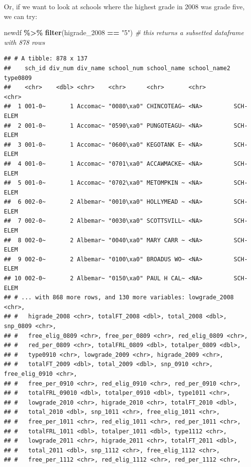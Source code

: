 \documentclass[
]{book}
\newenvironment{Shaded}{\begin{snugshade}}{\end{snugshade}}
\newcommand{\CommentTok}[1]{\textcolor[rgb]{0.56,0.35,0.01}{\textit{#1}}}
\newcommand{\DecValTok}[1]{\textcolor[rgb]{0.00,0.00,0.81}{#1}}
\newcommand{\KeywordTok}[1]{\textcolor[rgb]{0.13,0.29,0.53}{\textbf{#1}}}
\newcommand{\NormalTok}[1]{#1}
\newcommand{\OperatorTok}[1]{\textcolor[rgb]{0.81,0.36,0.00}{\textbf{#1}}}
\newcommand{\StringTok}[1]{\textcolor[rgb]{0.31,0.60,0.02}{#1}}
\begin{document}
Or, if we want to look at schools where the highest grade in 2008 was grade five, we can try:

\begin{Shaded}
\begin{Highlighting}[]
\NormalTok{newdf }\OperatorTok{\%\textgreater{}\%}\StringTok{ }\KeywordTok{filter}\NormalTok{(higrade\_}\DecValTok{2008} \OperatorTok{==}\StringTok{ "5"}\NormalTok{) }\CommentTok{\# this returns a subsetted dataframe with 878 rows}
\end{Highlighting}
\end{Shaded}

\begin{verbatim}
## # A tibble: 878 x 137
##    sch_id div_num div_name school_num school_name school_name2 type0809
##    <chr>    <dbl> <chr>    <chr>      <chr>       <chr>        <chr>   
##  1 001-0~       1 Accomac~ "0080\xa0" CHINCOTEAG~ <NA>         SCH-ELEM
##  2 001-0~       1 Accomac~ "0590\xa0" PUNGOTEAGU~ <NA>         SCH-ELEM
##  3 001-0~       1 Accomac~ "0600\xa0" KEGOTANK E~ <NA>         SCH-ELEM
##  4 001-0~       1 Accomac~ "0701\xa0" ACCAWMACKE~ <NA>         SCH-ELEM
##  5 001-0~       1 Accomac~ "0702\xa0" METOMPKIN ~ <NA>         SCH-ELEM
##  6 002-0~       2 Albemar~ "0010\xa0" HOLLYMEAD ~ <NA>         SCH-ELEM
##  7 002-0~       2 Albemar~ "0030\xa0" SCOTTSVILL~ <NA>         SCH-ELEM
##  8 002-0~       2 Albemar~ "0040\xa0" MARY CARR ~ <NA>         SCH-ELEM
##  9 002-0~       2 Albemar~ "0100\xa0" BROADUS WO~ <NA>         SCH-ELEM
## 10 002-0~       2 Albemar~ "0150\xa0" PAUL H CAL~ <NA>         SCH-ELEM
## # ... with 868 more rows, and 130 more variables: lowgrade_2008 <chr>,
## #   higrade_2008 <chr>, totalFT_2008 <dbl>, total_2008 <dbl>, snp_0809 <chr>,
## #   free_elig_0809 <chr>, free_per_0809 <chr>, red_elig_0809 <chr>,
## #   red_per_0809 <chr>, totalFRL_0809 <dbl>, totalper_0809 <dbl>,
## #   type0910 <chr>, lowgrade_2009 <chr>, higrade_2009 <chr>,
## #   totalFT_2009 <dbl>, total_2009 <dbl>, snp_0910 <chr>, free_elig_0910 <chr>,
## #   free_per_0910 <chr>, red_elig_0910 <chr>, red_per_0910 <chr>,
## #   totalFRL_09010 <dbl>, totalper_0910 <dbl>, type1011 <chr>,
## #   lowgrade_2010 <chr>, higrade_2010 <chr>, totalFT_2010 <dbl>,
## #   total_2010 <dbl>, snp_1011 <chr>, free_elig_1011 <chr>,
## #   free_per_1011 <chr>, red_elig_1011 <chr>, red_per_1011 <chr>,
## #   totalFRL_1011 <dbl>, totalper_1011 <dbl>, type1112 <chr>,
## #   lowgrade_2011 <chr>, higrade_2011 <chr>, totalFT_2011 <dbl>,
## #   total_2011 <dbl>, snp_1112 <chr>, free_elig_1112 <chr>,
## #   free_per_1112 <chr>, red_elig_1112 <chr>, red_per_1112 <chr>,

\end{verbatim}
\end{document}
